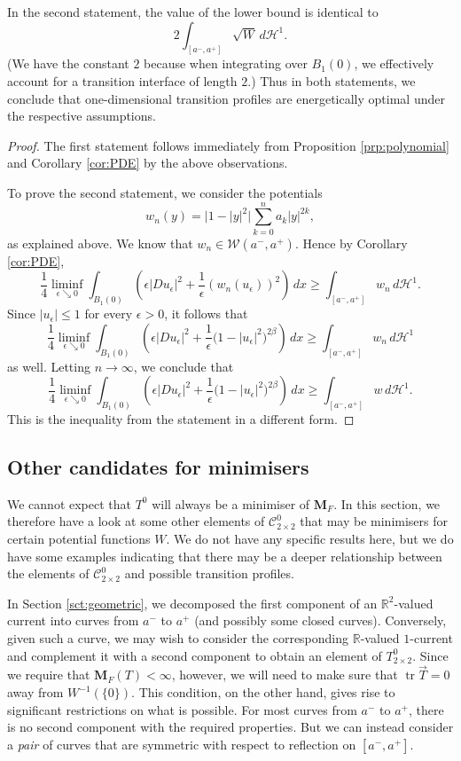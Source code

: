 \documentclass[a4paper]{article}
\newcommand{\R}{\mathbb{R}}
\newcommand{\Ha}{\mathcal{H}}
\newcommand{\M}{\mathbf{M}}
\newcommand{\ncrt}{\mathcal{C}}
\DeclareMathOperator{\tr}{tr}
\theoremstyle{definition}
\theoremstyle{remark}
\begin{document}
In the second statement, the value of the lower bound is identical to
\[
2\int_{[a^-, a^+]} \sqrt{W} \, d\Ha^1.
\]
(We have the constant $2$ because when integrating over
$B_1(0)$, we effectively account for a transition interface of length $2$.)
Thus in both statements, we conclude
that one-dimensional transition profiles are energetically optimal
under the respective assumptions.

\begin{proof}
The first statement follows immediately from Proposition \ref{prp:polynomial} and Corollary \ref{cor:PDE}
by the above observations.

To prove the second statement, we consider the potentials
\[
w_n(y) = \bigl|1 - |y|^2\bigr| \sum_{k = 0}^n a_k |y|^{2k},
\]
as explained above. We know that $w_n \in \mathcal{W}(a^-, a^+)$. Hence by Corollary \ref{cor:PDE},
\[
\frac{1}{4} \liminf_{\epsilon \searrow 0} \int_{B_1(0)} \left(\epsilon |Du_\epsilon|^2 + \frac{1}{\epsilon} (w_n(u_\epsilon))^2\right) \, dx \ge \int_{[a^-, a^+]} w_n \, d\Ha^1.
\]
Since $|u_\epsilon| \le 1$ for every $\epsilon > 0$, it follows that
\[
\frac{1}{4} \liminf_{\epsilon \searrow 0} \int_{B_1(0)} \left(\epsilon |Du_\epsilon|^2 + \frac{1}{\epsilon} \bigl(1 - |u_\epsilon|^2\bigr)^{2\beta}\right) \, dx \ge \int_{[a^-, a^+]} w_n \, d\Ha^1
\]
as well. Letting $n \to \infty$, we conclude that
\[
\frac{1}{4} \liminf_{\epsilon \searrow 0} \int_{B_1(0)} \left(\epsilon |Du_\epsilon|^2 + \frac{1}{\epsilon} \bigl(1 - |u_\epsilon|^2\bigr)^{2\beta}\right) \, dx \ge \int_{[a^-, a^+]} w \, d\Ha^1.
\]
This is the inequality from the statement in a different form.
\end{proof}





\subsection{Other candidates for minimisers}

We cannot expect that $T^0$ will always be a minimiser of $\M_F$. In this section,
we therefore have a look at some other elements of $\ncrt_{2 \times 2}^0$ that
may be minimisers for certain potential functions $W$.
We do not have any specific results here, but we do have some examples indicating
that there may be a deeper relationship between the elements of $\ncrt_{2 \times 2}^0$ and possible
transition profiles.

In Section \ref{sct:geometric}, we decomposed the first component of an $\R^2$-valued
current into curves from $a^-$ to $a^+$ (and possibly some closed curves). Conversely, given such a curve, we may wish
to consider the corresponding $\R$-valued $1$-current and complement it with a second
component to obtain an element of $T_{2 \times 2}^0$. Since we require that
$\M_F(T) < \infty$, however, we will need to make sure that $\tr \vec{T} = 0$
away from $W^{-1}(\{0\})$. This condition, on the other hand, gives rise to significant restrictions
on what is possible. For most curves from $a^-$ to $a^+$, there is no second component
with the required properties. But we can instead consider a \emph{pair} of curves that are
symmetric with respect to reflection on $[a^-, a^+]$.
\end{document}
